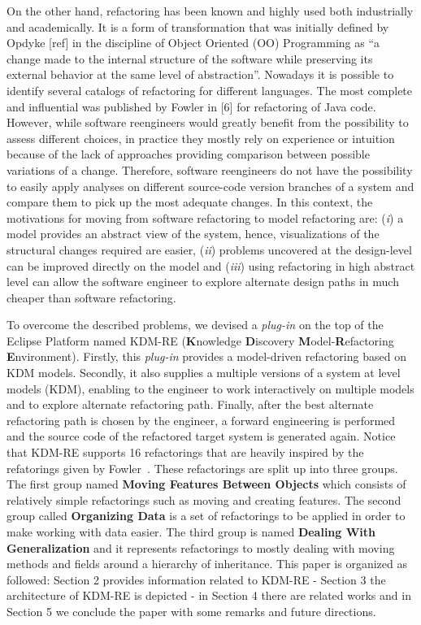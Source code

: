 On the other hand, refactoring has been known and highly used both industrially and academically. It is a form of transformation that was initially defined by Opdyke [ref] in the discipline of Object Oriented (OO) Programming as ``a change made to the internal structure of the software while preserving its external behavior at the same level of abstraction''. Nowadays it is possible to identify several catalogs of refactoring for different languages. The most complete and influential was published by Fowler in [6] for refactoring of Java code. 
However, while software reengineers would greatly benefit from the possibility to assess different choices, in practice they mostly rely on experience or intuition because of the lack of approaches providing comparison between possible variations of a change. 
Therefore, software reengineers do not have the possibility to easily apply analyses on different source-code version branches of a system and compare them to pick up the most adequate changes. In this context, the motivations for moving from software refactoring  to model refactoring are: 
(\textit{i}) a model provides an abstract view of the system, hence, visualizations of the structural changes required are easier, 
(\textit{ii}) problems uncovered at the design-level can be improved directly on the model and 
(\textit{iii}) using refactoring in high abstract level can allow the software engineer to explore alternate design paths in much cheaper than software refactoring.

To overcome the described problems, we devised a \textit{plug-in} on the top of the Eclipse Platform named KDM-RE (\textbf{K}nowledge \textbf{D}iscovery \textbf{M}odel-\textbf{R}efactoring \textbf{E}nvironment). Firstly, this \textit{plug-in} provides a model-driven refactoring based on KDM models. Secondly, it also supplies a multiple versions of a system at level models (KDM), enabling to the engineer  to work interactively on multiple models and to explore alternate refactoring path. Finally, after the best alternate refactoring path is chosen by the engineer, a forward engineering is performed and the source code of the refactored target system is generated again. Notice that KDM-RE supports 16 refactorings that are heavily inspired by the refatorings given by Fowler~\cite{aqui}. These refactorings are split up into three groups. The first group named \textbf{Moving Features Between Objects} which consists of relatively simple refactorings such as moving and creating features. The second group called \textbf{Organizing Data} is a set of refactorings to be applied in order to make working with data easier. The third group is named \textbf{Dealing With Generalization} and it represents refactorings to mostly dealing with moving methods and fields around a hierarchy of inheritance. This paper is organized as followed: Section 2 provides information related to KDM-RE - Section 3 the architecture of KDM-RE is depicted - in Section 4 there are related works and in Section 5 we conclude the paper with some remarks and future directions.





